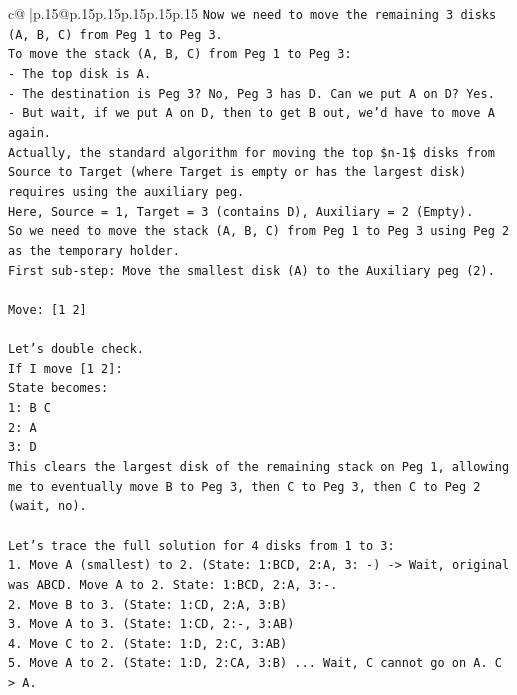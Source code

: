 \documentclass{article}
\begin{document}
{\begin{supertabular}{c@{$\;$}|p{.15\linewidth}@{}p{.15\linewidth}p{.15\linewidth}p{.15\linewidth}p{.15\linewidth}p{.15\linewidth}}
{{{\texttt{Now we need to move the remaining 3 disks (A, B, C) from Peg 1 to Peg 3.} \\
\texttt{To move the stack (A, B, C) from Peg 1 to Peg 3:} \\
\texttt{{-} The top disk is A.} \\
\texttt{{-} The destination is Peg 3? No, Peg 3 has D. Can we put A on D? Yes.} \\
\texttt{{-} But wait, if we put A on D, then to get B out, we'd have to move A again.} \\
\texttt{Actually, the standard algorithm for moving the top \$n{-}1\$ disks from Source to Target (where Target is empty or has the largest disk) requires using the auxiliary peg.} \\
\texttt{Here, Source = 1, Target = 3 (contains D), Auxiliary = 2 (Empty).} \\
\texttt{So we need to move the stack (A, B, C) from Peg 1 to Peg 3 using Peg 2 as the temporary holder.} \\
\texttt{First sub{-}step: Move the smallest disk (A) to the Auxiliary peg (2).} \\
\\ 
\texttt{Move: {[}1 2{]}} \\
\\ 
\texttt{Let's double check.} \\
\texttt{If I move {[}1 2{]}:} \\
\texttt{State becomes:} \\
\texttt{1: B C} \\
\texttt{2: A} \\
\texttt{3: D} \\
\texttt{This clears the largest disk of the remaining stack on Peg 1, allowing me to eventually move B to Peg 3, then C to Peg 3, then C to Peg 2 (wait, no).} \\
\\ 
\texttt{Let's trace the full solution for 4 disks from 1 to 3:} \\
\texttt{1. Move A (smallest) to 2. (State: 1:BCD, 2:A, 3: {-}) {-}> Wait, original was ABCD. Move A to 2. State: 1:BCD, 2:A, 3:{-}.} \\
\texttt{2. Move B to 3. (State: 1:CD, 2:A, 3:B)} \\
\texttt{3. Move A to 3. (State: 1:CD, 2:{-}, 3:AB)} \\
\texttt{4. Move C to 2. (State: 1:D, 2:C, 3:AB)} \\
\texttt{5. Move A to 2. (State: 1:D, 2:CA, 3:B) ... Wait, C cannot go on A. C > A.} \\
}}}
\end{supertabular}}
\end{document}
